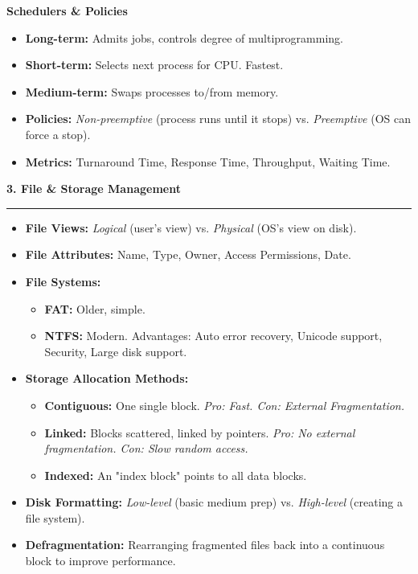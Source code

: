 \documentclass[a4paper, 8pt]{extarticle}
\newcommand{\sectionheading}[1]{\large\textbf{#1}\par\noindent\rule{\linewidth}{0.4pt}}
\newcommand{\subsectionheading}[1]{\normalsize\textbf{#1}}
\begin{document}
\begin{multicols}{2}
\subsectionheading{Schedulers  & Policies}
\begin{tcolorbox}[title=\textbf{Scheduler Comparison}]
\begin{itemize}
    \item \textbf{Long-term:} Admits jobs, controls degree of multiprogramming.
    \item \textbf{Short-term:} Selects next process for CPU. Fastest.
    \item \textbf{Medium-term:} Swaps processes to/from memory.
\end{itemize}
\end{tcolorbox}
\begin{itemize}
    \item \textbf{Policies:} \textit{Non-preemptive} (process runs until it stops) vs. \textit{Preemptive} (OS can force a stop).
    \item \textbf{Metrics:} Turnaround Time, Response Time, Throughput, Waiting Time.
\end{itemize}

\vspace{1em}
\sectionheading{3. File \& Storage Management}
\vspace{0.5em}
\begin{itemize}
    \item \textbf{File Views:} \textit{Logical} (user's view) vs. \textit{Physical} (OS's view on disk).
    \item \textbf{File Attributes:} Name, Type, Owner, Access Permissions, Date.
    \item \textbf{File Systems:}
        \begin{itemize}
            \item \textbf{FAT:} Older, simple.
            \item \textbf{NTFS:} Modern. Advantages: Auto error recovery, Unicode support, Security, Large disk support.
        \end{itemize}
    \item \textbf{Storage Allocation Methods:}
        \begin{itemize}
            \item \textbf{Contiguous:} One single block. \textit{Pro: Fast. Con: External Fragmentation.}
            \item \textbf{Linked:} Blocks scattered, linked by pointers. \textit{Pro: No external fragmentation. Con: Slow random access.}
            \item \textbf{Indexed:} An "index block" points to all data blocks.
        \end{itemize}
    \item \textbf{Disk Formatting:} \textit{Low-level} (basic medium prep) vs. \textit{High-level} (creating a file system).
    \item \textbf{Defragmentation:} Rearranging fragmented files back into a continuous block to improve performance.
\end{itemize}

\end{multicols}
\end{document}
